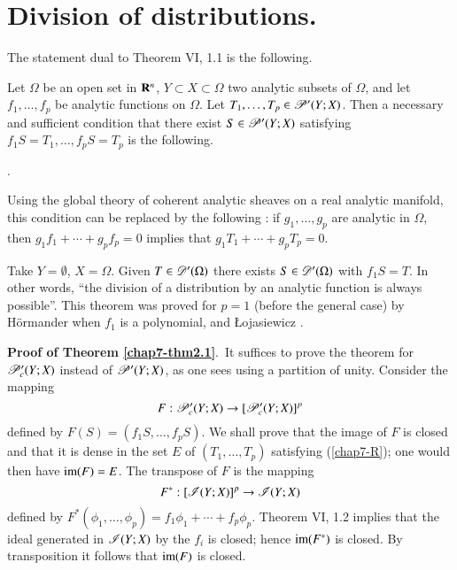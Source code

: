 \section[Division of distributions]{Division of distributions.}\label{chap7-sec2}

The statement dual to Theorem VI, 1.1 is the following.

\begin{theorem}\label{chap7-thm2.1}
Let $\Omega$ be an open set in $\mathbf{R}^{n}$, $Y\subset X\subset \Omega$ two analytic subsets of $\Omega$, and let $f_{1},\ldots,f_{p}$ be analytic functions on $\Omega$. Let $T_{1},\ldots,T_{p}\in \mathscr{P}'(Y;X)$. Then a necessary and sufficient condition that there exist $S\in\mathscr{P}'(Y;X)$ satisfying $f_{1}S=T_{1},\ldots,f_{p}S=T_{p}$ is the following.
\end{theorem}

.\label{chap7-R}

\begin{remark}\label{chap7-rem2.2}
Using the global theory of coherent analytic sheaves on a real analytic manifold, this condition can be replaced by the following : if $g_{1},\ldots,g_{p}$ are analytic in $\Omega$, then $g_{1}f_{1}+\cdots+g_{p}f_{p}=0$ implies that $g_{1}T_{1}+\cdots+g_{p}T_{p}=0$.
\end{remark}

\begin{example}\label{chap7-exam2.3}
Take $Y=\emptyset$, $X=\Omega$. Given $T\in \mathscr{D}'(\Omega)$ there exists $S\in\mathscr{D}'(\Omega)$ with $f_{1}S=T$. In other words, ``the division of a distribution by an analytic function is always possible''. This theorem was proved for $p=1$ (before the general case) by H\"ormander \cite{L. Hormander : 1} when $f_{1}$ is a polynomial, and {\L}ojasiewicz \cite{S. Lojasiewicz : 1}.
\end{example}

\noindent
{\bf Proof of Theorem \ref{chap7-thm2.1}}.~It suffices to prove the theorem for $\mathscr{P}'_{c}(Y;X)$ instead of $\mathscr{P}'(Y;X)$, as one sees using a partition of unity. Consider the mapping
$$
F:\mathscr{P}'_{c}(Y;X)\to [\mathscr{P}'_{c}(Y;X)]^{p}
$$
defined by $F(S)=(f_{1}S,\ldots,f_{p}S)$. We shall prove that the image of $F$ is closed and that it is dense in the set $E$ of $(T_{1},\ldots,T_{p})$ satisfying (\ref{chap7-R}); one would then have $\operatorname{im}(F)=E$. The transpose of $F$ is the mapping
$$
F^{*}:[\mathscr{I}(Y;X)]^{p}\to \mathscr{I}(Y;X)
$$
defined by $F^{*}(\phi_{1},\ldots,\phi_{p})=f_{1}\phi_{1}+\cdots+f_{p}\phi_{p}$. Theorem VI, 1.2 implies that the ideal generated in $\mathscr{I}(Y;X)$ by the $f_{i}$ is closed; hence $\operatorname{im}(F^{*})$ is closed. By transposition it follows that $\operatorname{im}(F)$ is closed.

